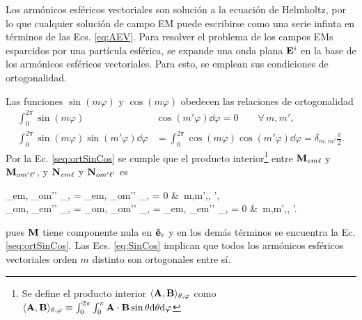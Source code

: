 Los armónicos esféricos vectoriales son solución a la ecuación de Helmholtz, por lo que cualquier solución de campo EM puede escribirse como una serie infinta en términos de las Ecs. \eqref{eq:AEV}. Para resolver el problema de los campos EMs esparcidos por una partícula esférica, se expande una onda plana $\vb{E}^i$ en la base de los armónicos esféricos vectoriales. Para esto, se emplean sus  condiciones de ortogonalidad.

Las funciones $\sin(m\varphi)$ y $\cos(m\varphi)$ obedecen las relaciones de ortogonalidad
 	\begin{subequations}
	\begin{align}
	\int_0^{2\pi} \sin(m\varphi) &\cos(m' \varphi) \dd\varphi = 0 \qquad \forall\, m,m',\label{seq:ortSinCos}\\
	\int_0^{2\pi} \sin(m\varphi) \sin(m'\varphi)\dd\varphi &=  \int_0^{2\pi} \cos(m\varphi) \cos(m'\varphi)\dd\varphi  = \delta_{m,m'}\frac{\pi}{2}.\label{seq:ortCos2}
	\end{align}\label{eq:SinCos}
 	\end{subequations}
Por la Ec. \eqref{seq:ortSinCos} se cumple que el producto interior\footnote{Se define el producto interior $\langle \vb{A},\vb{B} \rangle_{\theta,\varphi}$ como $\langle \vb{A},\vb{B} \rangle_{\theta,\varphi} \equiv \int_0^{2\pi}\int_0^\pi \vb{A}\cdot\vb{B} \sin\theta \dd\theta \dd\varphi$} entre $\vb{M}_{em\ell}$ y $\vb{M}_{om'\ell'}$, y $\vb{N}_{em\ell}$ y $\vb{N}_{om'\ell'}$ es
	\begin{tcolorbox}
		\langle{}_{em\ell}, _{om'\ell'} \rangle_{\theta,\varphi} =
		\langle{}_{em\ell}, _{om'\ell'} \rangle_{\theta,\varphi} = 0
		&\qquad \forall\,  m,m',\ell, \ell',\\
		\intertext{así como también}
		\langle{}_{om\ell}, _{em'\ell'} \rangle_{\theta,\varphi} = 
		\langle{}_{om\ell}, _{om'\ell'} \rangle_{\theta,\varphi} = 	
		\langle{}_{em\ell}, _{em'\ell'} \rangle_{\theta,\varphi} = 	0
		&\qquad \forall\,  m,m',\ell, \ell'.				
	\end{tcolorbox}\noindent
pues $\vb{M}$ tiene componente nula en $\vu{e}_r$ y en los demás términos se encuentra la Ec. \eqref{seq:ortSinCos}. Las Ecs. \eqref{eq:SinCos} implican que todos los armónicos esféricos vectoriales orden $m$ distinto  son ortogonales entre sí.\\

